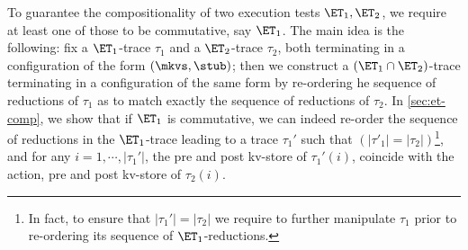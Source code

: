 To guarantee the compositionality of two execution tests $\ET_1, \ET_2$, we 
require at least one of those to be commutative, say $\ET_1$. The main idea 
is the following: fix a $\ET_1$-trace $\tau_1$ and a $\ET_2$-trace $\tau_2$, both terminating in a configuration 
of the form $(\mkvs, \stub)$; then we construct a $(\ET_1 \cap \ET_2)$-trace terminating 
in a configuration of the same form by re-ordering he sequence of 
reductions of $\tau_1$ as to match exactly the sequence of 
reductions of $\tau_2$. 
In \cref{sec:et-comp}, we show that if $\ET_1$ is commutative, 
we can indeed re-order the sequence of reductions in the 
$\ET_1$-trace leading to a trace $\tau_1'$ such that $(\lvert \tau'_1 \rvert = \lvert \tau_2 \rvert)$\footnote{In fact, 
to ensure that $\lvert \tau_1' \rvert = \lvert \tau_2 \rvert$ we require to further manipulate 
$\tau_1$ prior to re-ordering its sequence of $\ET_1$-reductions.}, 
and for any 
$i=1,\cdots, \lvert \tau_1'\rvert$, the pre and post kv-store of $\tau_1'(i)$,
 coincide with the action, pre and post kv-store 
of $\tau_2(i)$.


